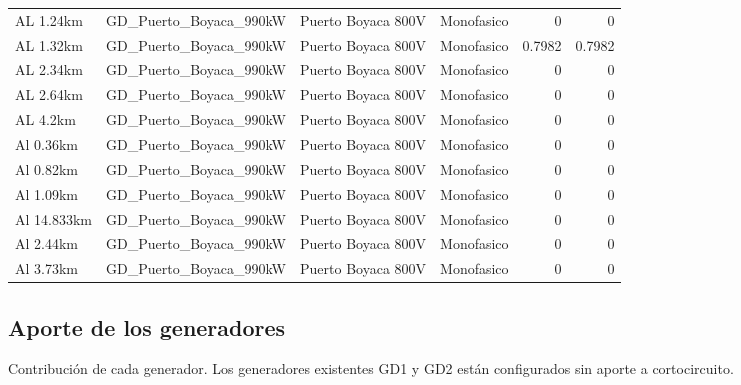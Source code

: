\documentclass[11pt,a4paper]{article}
\begin{document}
\begin{longtable}{llllrr}
AL 1.24km & GD\_Puerto\_Boyaca\_990kW & Puerto Boyaca 800V & Monofasico & 0 & 0 \\
AL 1.32km & GD\_Puerto\_Boyaca\_990kW & Puerto Boyaca 800V & Monofasico & 0.7982 & 0.7982 \\
AL 2.34km & GD\_Puerto\_Boyaca\_990kW & Puerto Boyaca 800V & Monofasico & 0 & 0 \\
AL 2.64km & GD\_Puerto\_Boyaca\_990kW & Puerto Boyaca 800V & Monofasico & 0 & 0 \\
AL 4.2km & GD\_Puerto\_Boyaca\_990kW & Puerto Boyaca 800V & Monofasico & 0 & 0 \\
Al 0.36km & GD\_Puerto\_Boyaca\_990kW & Puerto Boyaca 800V & Monofasico & 0 & 0 \\
Al 0.82km & GD\_Puerto\_Boyaca\_990kW & Puerto Boyaca 800V & Monofasico & 0 & 0 \\
Al 1.09km & GD\_Puerto\_Boyaca\_990kW & Puerto Boyaca 800V & Monofasico & 0 & 0 \\
Al 14.833km & GD\_Puerto\_Boyaca\_990kW & Puerto Boyaca 800V & Monofasico & 0 & 0 \\
Al 2.44km & GD\_Puerto\_Boyaca\_990kW & Puerto Boyaca 800V & Monofasico & 0 & 0 \\
Al 3.73km & GD\_Puerto\_Boyaca\_990kW & Puerto Boyaca 800V & Monofasico & 0 & 0 \\
\end{longtable}

\subsection{Aporte de los generadores}

Contribuci\'on de cada generador. Los generadores existentes GD1 y GD2 est\'an configurados sin aporte a cortocircuito.
\end{document}
